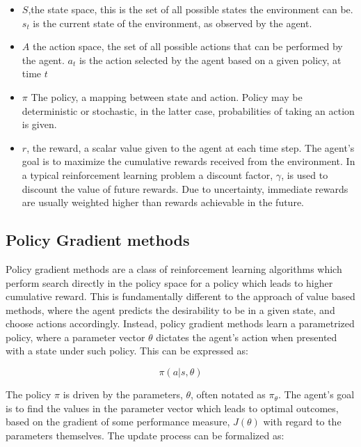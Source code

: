 \begin{itemize}
    \item $S$,the state space, this is the set of all possible states the environment can be. $s_t$ is the current state of the environment, as observed by the agent.
    \item $A$ the action space, the set of all possible actions that can be performed by the agent. $a_t$ is the action selected by the agent based on a given policy, at time $t$
    \item $\pi$ The policy, a mapping between state and action. Policy may be deterministic or stochastic, in the latter case, probabilities of taking an action is given.
    \item $r$, the reward, a scalar value given to the agent at each time step. The agent's goal is to maximize the cumulative rewards received from the environment. In a typical reinforcement learning problem a discount factor, $\gamma$, is used to discount the value of future rewards. Due to uncertainty, immediate rewards are usually weighted higher than rewards achievable in the future. 
\end{itemize}




\subsection{Policy Gradient methods}


Policy gradient methods are a class of reinforcement learning algorithms which perform search directly in the policy space for a policy which leads to higher cumulative reward. This is fundamentally different to the approach of value based methods, where the agent predicts the desirability to be in a given state, and choose actions accordingly. Instead, policy gradient methods learn a parametrized policy, where a parameter vector $\theta$ dictates the agent's action when presented with a state under such policy. This can be expressed as:

\begin{equation}
    \pi(a|s,\theta) 
\end{equation}

The policy $\pi$ is driven by the parameters, $\theta$, often notated as $\pi_{\theta}$. The agent's goal is to find the values in the parameter vector which leads to optimal outcomes, based on the gradient of some performance measure, $J(\theta)$ with regard to the parameters themselves. The update process can be formalized as: 

